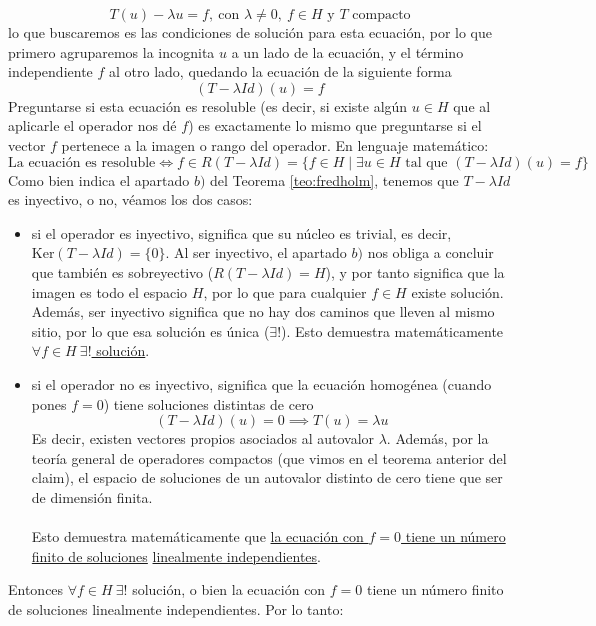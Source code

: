 $$T(u) - \lambda u = f, \ \text{con } \lambda \neq 0, \ f \in H \text{ y } T \text{ compacto}$$
lo que buscaremos es las condiciones de solución para esta ecuación, por lo que primero agruparemos la incognita $u$ a un lado de la ecuación, y el término independiente $f$ al otro lado, quedando la ecuación de la siguiente forma
\begin{equation*}
    (T - \lambda Id)(u) = f
\end{equation*}
Preguntarse si esta ecuación es resoluble (es decir, si existe algún $u \in H$ que al aplicarle el operador nos dé $f$) es exactamente lo mismo que preguntarse si el vector $f$ pertenece a la imagen o rango del operador. En lenguaje matemático:
$$\text{La ecuación es resoluble} \iff f \in R(T - \lambda Id)=\{ f \in H \mid \exists u \in H \text{ tal que } (T - \lambda Id)(u) = f \}$$
Como bien indica el apartado $b)$ del Teorema \ref{teo:fredholm}, tenemos que $T-\lambda Id$ es inyectivo, o no, véamos los dos casos:
\begin{itemize}
    \item {} si el operador es inyectivo, significa que su núcleo es trivial, es decir, $\text{Ker}(T - \lambda Id) = \{0\}$. Al ser inyectivo, el apartado $b)$ nos obliga a concluir que también es sobreyectivo ($R(T - \lambda Id) = H$), y por tanto significa que la imagen es todo el espacio $H$, por lo que para cualquier $f \in H$ existe solución.  \\ 
    \noindent
    Además, ser inyectivo significa que no hay dos caminos que lleven al mismo sitio, por lo que esa solución es única ($\exists!$).  Esto demuestra matemáticamente \underline{$\forall f \in H \ \exists!$ solución}.
    \item {} si el operador no es inyectivo, significa que la ecuación homogénea (cuando pones $f = 0$) tiene soluciones distintas de cero
    $$(T - \lambda Id)(u) = 0 \implies T(u) = \lambda u$$
    Es decir, existen vectores propios asociados al autovalor $\lambda$. Además, por la teoría general de operadores compactos (que vimos en el teorema anterior del claim), el espacio de soluciones de un autovalor distinto de cero tiene que ser de dimensión finita. \\ \\
    \noindent
    Esto demuestra matemáticamente que \underline{la ecuación con $f = 0$ tiene un número finito de soluciones} \underline{linealmente independientes}. \\
\end{itemize}
\noindent
Entonces $\forall f \in H \ \exists!$ solución, o bien la ecuación con $f = 0$ tiene un número finito de soluciones linealmente independientes. Por lo tanto:

